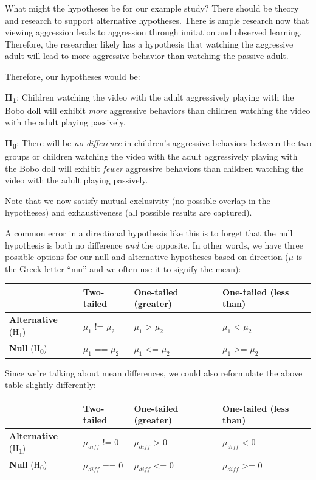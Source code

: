 \documentclass[
]{book}
\begin{document}
What might the hypotheses be for our example study? There should be theory and research to support alternative hypotheses. There is ample research now that viewing aggression leads to aggression through imitation and observed learning. Therefore, the researcher likely has a hypothesis that watching the aggressive adult will lead to more aggressive behavior than watching the passive adult.

Therefore, our hypotheses would be:

\textbf{H\textsubscript{1}}: Children watching the video with the adult aggressively playing with the Bobo doll will exhibit \emph{more} aggressive behaviors than children watching the video with the adult playing passively.

\textbf{H\textsubscript{0}}: There will be \emph{no difference} in children's aggressive behaviors between the two groups or children watching the video with the adult aggressively playing with the Bobo doll will exhibit \emph{fewer} aggressive behaviors than children watching the video with the adult playing passively.

Note that we now satisfy mutual exclusivity (no possible overlap in the hypotheses) and exhaustiveness (all possible results are captured).

A common error in a directional hypothesis like this is to forget that the null hypothesis is both no difference \emph{and} the opposite. In other words, we have three possible options for our null and alternative hypotheses based on direction (\(\mu\) is the Greek letter ``mu'' and we often use it to signify the mean):

\begin{longtable}[]{@{}llll@{}}
\toprule
& Two-tailed & One-tailed (greater) & One-tailed (less than) \\
\midrule
\endhead
\textbf{Alternative} (H\textsubscript{1}) & \(\mu_1\) != \(\mu_2\) & \(\mu_1\) \textgreater{} \(\mu_2\) & \(\mu_1\) \textless{} \(\mu_2\) \\
\textbf{Null} (H\textsubscript{0}) & \(\mu_1\) == \(\mu_2\) & \(\mu_1\) \textless= \(\mu_2\) & \(\mu_1\) \textgreater= \(\mu_2\) \\
\bottomrule
\end{longtable}

Since we're talking about mean differences, we could also reformulate the above table slightly differently:

\begin{longtable}[]{@{}llll@{}}
\toprule
& Two-tailed & One-tailed (greater) & One-tailed (less than) \\
\midrule
\endhead
\textbf{Alternative} (H\textsubscript{1}) & \(\mu_{diff}\) != 0 & \(\mu_{diff}\) \textgreater{} 0 & \(\mu_{diff}\) \textless{} 0 \\
\textbf{Null} (H\textsubscript{0}) & \(\mu_{diff}\) == 0 & \(\mu_{diff}\) \textless= 0 & \(\mu_{diff}\) \textgreater= 0 \\
\bottomrule
\end{longtable}
\end{document}
